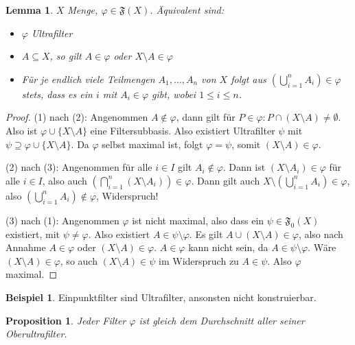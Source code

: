 \documentclass[12pt]{scrartcl}%
\newtheorem{prop}{Proposition}
\newtheorem{lemma}{Lemma}
\theoremstyle{definition}
\newtheorem{bsp}{Beispiel}
\theoremstyle{remark}
\newcommand{\filterset}{\mathfrak{F}}
\begin{document}
\begin{lemma}
    $X$ Menge, $\varphi\in \filterset(X)$. Äquivalent sind:

    \begin{itemize}
        \item $\varphi$ Ultrafilter
        \item $A\subseteq X$, so gilt $A\in\varphi$ oder $X\setminus A\in\varphi$
        \item Für je endlich viele Teilmengen $A_1,\dots,A_n$ von $X$ folgt aus $\left(\bigcup_{i=1}^n A_i \right) \in\varphi$ stets, dass es ein $i$ mit $A_i\in\varphi$ gibt, wobei $1\leq i\leq n$.
    \end{itemize}
\end{lemma}

\begin{proof}
    (1) nach (2): Angenommen $A\not\in \varphi$, dann gilt für $P\in\varphi: P\cap (X\setminus A) \neq \emptyset$. Also ist $\varphi \cup \{X\setminus A\}$ eine Filtersubbasis. Also existiert Ultrafilter $\psi$ mit $\psi \supseteq \varphi \cup \{X\setminus A\}$. Da $\varphi$ selbst maximal ist, folgt $\varphi=\psi$, somit $(X\setminus A)\in\varphi$.

    (2) nach (3): Angenommen für alle $i\in I$ gilt $A_i\not\in\varphi$. Dann ist $(X\setminus A_i)\in\varphi$ für alle $i\in I$, also auch $\left(\bigcap_{i=1}^n (X\setminus A_i)\right) \in \varphi$. Dann gilt auch $X\setminus \left( \bigcup_{i=1}^n A_i \right) \in \varphi$, also $\left( \bigcup_{i=1}^n A_i \right) \not\in \varphi$, Widerspruch!

    (3) nach (1): Angenommen $\varphi$ ist nicht maximal, also dass ein $\psi\in\filterset_0(X)$ existiert, mit $\psi \neq \varphi$. Also existiert $A\in \psi\setminus \varphi$. Es gilt $A \cup (X\setminus A) \in \varphi$, also nach Annahme $A\in\varphi$ oder $(X\setminus A) \in \varphi$. $A\in\varphi$ kann nicht sein, da $A\in\psi\setminus\varphi$. Wäre $(X\setminus A) \in\varphi$, so auch $(X\setminus A)\in \psi$ im Widerspruch zu $A\in\psi$. Also $\varphi$ maximal.
\end{proof}

\begin{bsp}
    Einpunktfilter sind Ultrafilter, ansonsten nicht konstruierbar.
\end{bsp}

\begin{prop}
    Jeder Filter $\varphi$ ist gleich dem Durchschnitt aller seiner Oberultrafilter.
\end{prop}
\end{document}

